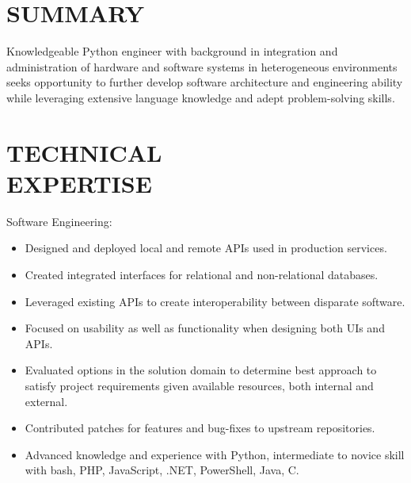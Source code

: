 \documentclass[line,margin]{res}
\begin{document}


 
\begin{resume}
 
\section{SUMMARY}
    Knowledgeable Python engineer with background in integration and
    administration of hardware and software systems in heterogeneous
    environments seeks opportunity to further develop software architecture
    and engineering ability while leveraging extensive language knowledge
    and adept problem-solving skills.


\section{TECHNICAL \\ EXPERTISE}

    Software Engineering:
    \vspace{1 mm}
    \begin{itemize}
        \itemsep -1.5pt %
        \item Designed and deployed local and remote APIs used in
            production services.
        \item Created integrated interfaces for relational and
            non-relational databases.
        \item Leveraged existing APIs to create interoperability between
            disparate software.
        \item Focused on usability as well as functionality when designing
            both UIs and APIs.
        \item Evaluated options in the solution domain to determine best
            approach to satisfy project requirements given available
            resources, both internal and external.
        \item Contributed patches for features and bug-fixes to upstream
            repositories.
        \item Advanced knowledge and experience with Python, intermediate
            to novice skill with bash, PHP, JavaScript, .NET, PowerShell,
            Java, C.
    \end{itemize}
    \vspace{-3 mm}


\end{resume}
\end{document}
